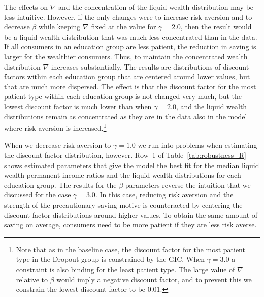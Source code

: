 \documentclass[../HAFiscal]{subfiles}
\begin{document}
The effects on $\nabla$ and the concentration of the liquid wealth distribution may be less intuitive. However, if the only changes were to increase risk aversion and to decrease $\beta$ while keeping $\nabla$ fixed at the value for $\gamma=2.0$, then the result would be a liquid wealth distribution that was much less concentrated than in the data. If all consumers in an education group are less patient, the reduction in saving is larger for the wealthier consumers. Thus, to maintain the concentrated wealth distribution $\nabla$ increases substantially. The results are distributions of discount factors within each education group that are centered around lower values, but that are much more dispersed. The effect is that the discount factor for the most patient type within each education group is not changed very much, but the lowest discount factor is much lower than when $\gamma=2.0$, and the liquid wealth distributions remain as concentrated as they are in the data also in the model where risk aversion is increased.\footnote{Note that as in the baseline case, the discount factor for the most patient type in the Dropout group is constrained by the GIC. When $\gamma=3.0$ a constraint is also binding for the least patient type. The large value of $\nabla$ relative to $\beta$ would imply a negative discount factor, and to prevent this we constrain the lowest discount factor to be $0.01$.}

When we decrease risk aversion to $\gamma=1.0$ we run into problems when estimating the discount factor distribution, however. Row~1 of Table~\ref{tab:robustness_R} shows estimated parameters that give the model the best fit for the median liquid wealth permanent income ratios and the liquid wealth distributions for each education group. The results for the $\beta$ parameters reverse the intuition that we discussed for the case $\gamma=3.0$. In this case, reducing risk aversion and the strength of the precautionary saving motive is counteracted by centering the discount factor distributions around higher values. To obtain the same amount of saving on average, consumers need to be more patient if they are less risk averse.  
\end{document}
